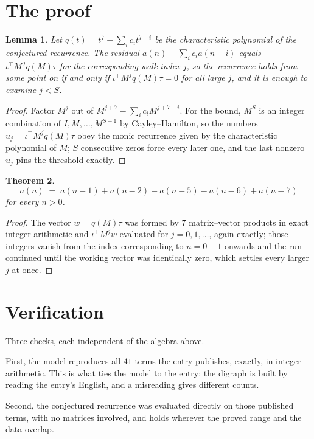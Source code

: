 \documentclass[11pt,a4paper]{article}
\theoremstyle{plain}
\newtheorem{theorem}{Theorem}
\newtheorem{lemma}[theorem]{Lemma}
\theoremstyle{definition}
\begin{document}
\section{The proof}

\begin{lemma}\label{lem:crit}
Let $q(t)=t^{7}-\sum_i c_it^{7-i}$ be the characteristic polynomial of the
conjectured recurrence. The residual $a(n)-\sum_ic_ia(n-i)$ equals
$\iota^{\!\top}M^{\,j}q(M)\tau$ for the corresponding walk index $j$, so the recurrence
holds from some point on if and only if $\iota^{\!\top}M^{j}q(M)\tau=0$ for all large $j$,
and it is enough to examine $j<S$.
\end{lemma}

\begin{proof}
Factor $M^{j}$ out of $M^{j+7}-\sum_ic_iM^{j+7-i}$. For the bound, $M^{S}$
is an integer combination of $I,M,\dots,M^{S-1}$ by Cayley--Hamilton, so the numbers
$u_j=\iota^{\!\top}M^{j}q(M)\tau$ obey the monic recurrence given by the characteristic
polynomial of $M$; $S$ consecutive zeros force every later one, and the last nonzero $u_j$
pins the threshold exactly.
\end{proof}

\begin{theorem}
\[
a(n)\;=\;a(n-1) + a(n-2) - a(n-5) - a(n-6) + a(n-7)
\]
for every $n>0$.
\end{theorem}

\begin{proof}
The vector $w=q(M)\tau$ was formed by $7$ matrix--vector products in exact integer
arithmetic and $\iota^{\!\top}M^{j}w$ evaluated for $j=0,1,\dots$, again exactly; those
integers vanish from the index corresponding to $n=0+1$ onwards and the run continued
until the working vector was identically zero, which settles every larger $j$ at once.
\end{proof}

\section{Verification}

Three checks, each independent of the algebra above.

First, the model reproduces all $41$ terms the entry publishes, exactly, in integer
arithmetic. This is what ties the model to the entry: the digraph is built by reading the
entry's English, and a misreading gives different counts.

Second, the conjectured recurrence was evaluated directly on those published terms, with no
matrices involved, and holds wherever the proved range and the data overlap.
\end{document}
